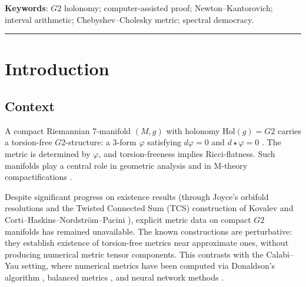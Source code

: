 \documentclass[11pt,a4paper]{article}
\theoremstyle{definition}
\theoremstyle{remark}
\newcommand{\Gtwo}{\mathrm{G}_2}
\def\Gtwo{G2}%
\begin{document}
\begin{abstract}
The NK certificate extends to the full 7D product metric via an analytical Fr\'echet bound on the K3 fiber, giving $\|T(g^*)\|_{C^0} \leq 1.59 \times 10^{-3}$, well below the Joyce perturbation threshold $\varepsilon_0 \approx 0.1$. The underlying seam-sector torsion at the NK iterate is $\eta \leq 2.949 \times 10^{-5}$ (direct sup of $\sqrt{|d\varphi|^2 + |d\star\varphi|^2}$ at Clenshaw--Curtis nodes, the value used in NK; the slightly larger $2.984 \times 10^{-5}$ in Table~\ref{tab:torsion_iter} is the conservative $\sqrt{(\sup|d\varphi|)^2 + (\sup|d\star\varphi|)^2}$), and the empirical 7D maximum measured directly over $220{,}000$ K3 fiber points is $3.154 \times 10^{-5}$. Conditional on the existence of a compact simply connected 7-manifold with Betti numbers $(b_2, b_3) = (21, 77)$ (a pair absent from all known $\Gtwo$ constructions), this certificate yields a torsion-free $\Gtwo$ metric on the compact manifold via Joyce's perturbation theorem.
\end{abstract}

\noindent\textbf{Keywords}: $\Gtwo$ holonomy; computer-assisted proof; Newton--Kantorovich; interval arithmetic; Chebyshev--Cholesky metric; spectral democracy.

\vfill
\noindent\rule{\textwidth}{0.2pt}

\newpage
\tableofcontents

\newpage

\section{Introduction}

\subsection{Context}

A compact Riemannian 7-manifold $(M, g)$ with holonomy $\mathrm{Hol}(g) = \Gtwo$ carries a torsion-free $\Gtwo$-structure: a 3-form $\varphi$ satisfying $d\varphi = 0$ and $d\star\varphi = 0$ \cite{Joyce2000,Bryant1987}. The metric is determined by $\varphi$, and torsion-freeness implies Ricci-flatness. Such manifolds play a central role in geometric analysis and in M-theory compactifications \cite{AcharyaWitten2001,Acharya1999}.

Despite significant progress on existence results (through Joyce's orbifold resolutions \cite{Joyce2000} and the Twisted Connected Sum (TCS) construction of Kovalev \cite{Kovalev2003} and Corti--Haskins--Nordstr\"om--Pacini \cite{CHNP2015}), explicit metric data on compact $\Gtwo$ manifolds has remained unavailable. The known constructions are perturbative: they establish existence of torsion-free metrics near approximate ones, without producing numerical metric tensor components. This contrasts with the Calabi--Yau setting, where numerical metrics have been computed via Donaldson's algorithm \cite{Donaldson2009}, balanced metrics \cite{HeadrickNassar2013}, and neural network methods \cite{LarforsLukasRuehle2022,Anderson2021}.
\end{document}
